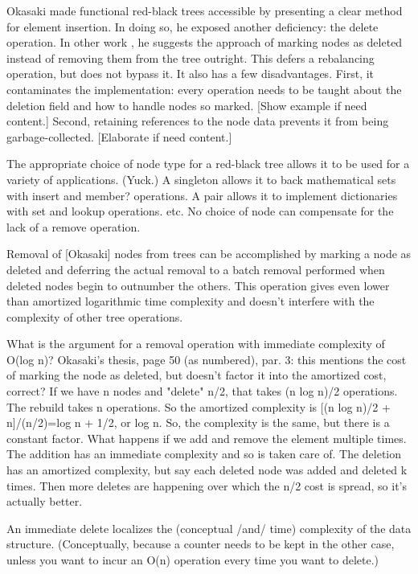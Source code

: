 \documentclass[preprint]{sigplanconf}
\begin{document}
Okasaki \cite{okasaki1999functional} made functional red-black trees accessible by presenting a clear method for element insertion. In doing so, he exposed another deficiency: the delete operation. In other work \cite{okasaki1999purely}, he suggests the approach of marking nodes as deleted instead of removing them from the tree outright. This defers a rebalancing operation, but does not bypass it. It also has a few disadvantages. First, it contaminates the implementation: every operation needs to be taught about the deletion field and how to handle nodes so marked. [Show example if need content.] Second, retaining references to the node data prevents it from being garbage-collected. [Elaborate if need content.]


The appropriate choice of node type for a red-black tree allows it to be used for a variety of applications. (Yuck.) A singleton allows it to back mathematical sets with insert and member? operations. A pair allows it to implement dictionaries with set and lookup operations. etc. No choice of node can compensate for the lack of a remove operation.

Removal of [Okasaki] nodes from trees can be accomplished by marking a node as deleted and deferring the actual removal to a batch removal performed when deleted nodes begin to outnumber the others. This operation gives even lower than amortized logarithmic time complexity and doesn't interfere with the complexity of other tree operations.

What is the argument for a removal operation with immediate complexity of O(log n)?
Okasaki's thesis, page 50 (as numbered), par. 3: this mentions the cost of marking the node as deleted, but doesn't factor it into the amortized cost, correct? If we have n nodes and "delete" n/2, that takes (n log n)/2 operations. The rebuild takes n operations. So the amortized complexity is [(n log n)/2 + n]/(n/2)=log n + 1/2, or log n. So, the complexity is the same, but there is a constant factor. What happens if we add and remove the element multiple times. The addition has an immediate complexity and so is taken care of. The deletion has an amortized complexity, but say each deleted node was added and deleted k times. Then more deletes are happening over which the n/2 cost is spread, so it's actually better.

An immediate delete localizes the (conceptual /and/ time) complexity of the data structure. (Conceptually, because a counter needs to be kept in the other case, unless you want to incur an O(n) operation every time you want to delete.)
\end{document}
